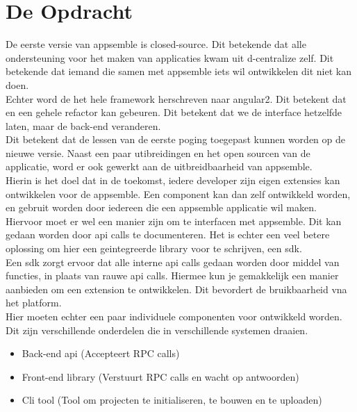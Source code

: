 \chapter{De Opdracht}

De eerste versie van appsemble is closed-source. Dit betekende dat alle ondersteuning voor het maken van applicaties kwam uit d-centralize zelf. Dit betekende dat iemand die samen met appsemble iets wil ontwikkelen dit niet kan doen. \\

Echter word de het hele framework herschreven naar angular2. Dit betekent dat en een gehele refactor kan gebeuren. Dit betekent dat we de interface hetzelfde laten, maar de back-end veranderen.\\

Dit betekent dat de lessen van de eerste poging toegepast kunnen worden op de nieuwe versie. Naast een paar utibreidingen en het open sourcen van de applicatie, word er ook gewerkt aan de uitbreidbaarheid van appsemble.\\

Hierin is het doel dat in de toekomst, iedere developer zijn eigen extensies kan ontwikkelen voor de appsemble. Een component kan dan zelf ontwikkeld worden, en gebruit worden door iedereen die een appsemble applicatie wil maken.\\

Hiervoor moet er wel een manier zijn om te interfacen met appsemble. Dit kan gedaan worden door api calls te documenteren. Het is echter een veel betere oplossing om hier een geintegreerde library voor te schrijven, een sdk.\\

Een sdk zorgt ervoor dat alle interne api calls gedaan worden  door middel van functies, in plaats van rauwe api calls. Hiermee kun je gemakkelijk een manier aanbieden om een extension te ontwikkelen. Dit bevordert de bruikbaarheid vna het platform.\\

Hier moeten echter een paar individuele componenten voor ontwikkeld worden. Dit zijn verschillende onderdelen die in verschillende systemen draaien.
\begin{itemize}
	\item Back-end api (Accepteert RPC calls)
	\item Front-end library (Verstuurt RPC calls en wacht op antwoorden)
	\item Cli tool (Tool om projecten te initialiseren, te bouwen en te uploaden)
\end{itemize}

